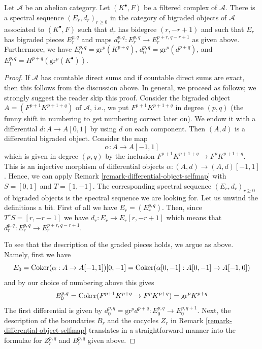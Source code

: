 \begin{lemma}
\label{lemma-spectral-sequence-filtered-complex}
Let $\mathcal{A}$ be an abelian category. Let $(K^\bullet, F)$ be a
filtered complex of $\mathcal{A}$. There is a spectral sequence
$(E_r, d_r)_{r \geq 0}$ in the category of bigraded objects of $\mathcal{A}$
associated to $(K^\bullet, F)$ such that $d_r$ has bidegree $(r, - r + 1)$
and such that $E_r$ has bigraded pieces $E_r^{p, q}$ and maps
$d_r^{p, q} : E_r^{p, q} \to E_r^{p + r, q - r + 1}$ as given above.
Furthermore, we have $E_0^{p, q} = \text{gr}^p(K^{p + q})$,
$d_0^{p, q} = \text{gr}^p(d^{p + q})$,
and $E_1^{p, q} = H^{p + q}(\text{gr}^p(K^\bullet))$.
\end{lemma}

\begin{proof}
If $\mathcal{A}$ has countable direct sums and if countable direct
sums are exact, then this follows from the discussion above.
In general, we proceed as follows; we strongly suggest the reader
skip this proof. Consider the bigraded object $A = (F^{p + 1}K^{p + 1 + q})$
of $\mathcal{A}$, i.e., we put $F^{p + 1}K^{p + 1 + q}$ in degree $(p, q)$
(the funny shift in numbering to get numbering correct later on).
We endow it with a differential $d : A \to A[0, 1]$ by using $d$
on each component. Then $(A, d)$ is a differential bigraded object.
Consider the map
$$
\alpha : A \to A[-1, 1]
$$
which is given in degree $(p, q)$ by the inclusion
$F^{p + 1}K^{p + 1 + q} \to F^pK^{p + 1 + q}$.
This is an injective morphism of differential objects
$\alpha : (A, d) \to (A, d)[-1, 1]$. Hence, we can apply
Remark \ref{remark-differential-object-selfmap}
with $S = [0, 1]$ and $T = [1, -1]$.
The corresponding spectral sequence $(E_r, d_r)_{r \geq 0}$
of bigraded objects is the spectral sequence we are looking
for. Let us unwind the definitions a bit. First of all we have
$E_r = (E_r^{p, q})$. Then, since $T^rS = [r, -r + 1]$
we have $d_r : E_r \to E_r[r, -r + 1]$ which means that
$d_r^{p, q} : E_r^{p, q} \to E_r^{p + r, q - r + 1}$.

\medskip\noindent
To see that the description of the graded pieces holds, we argue
as above. Namely, first we have
$$
E_0 = \mathop{\mathrm{Coker}}(\alpha : A \to A[-1, 1])[0, -1] =
\mathop{\mathrm{Coker}}(\alpha[0, -1] : A[0, -1] \to A[-1, 0])
$$
and by our choice of numbering above this gives
$$
E_0^{p, q} = \mathop{\mathrm{Coker}}(F^{p + 1}K^{p + q} \to F^pK^{p + q}) = \text{gr}^pK^{p + q}
$$
The first differential is given by
$d_0^{p, q} = \text{gr}^pd^{p + q} : E_0^{p, q} \to E_0^{p, q + 1}$.
Next, the description of the boundaries $B_r$ and the cocycles $Z_r$
in Remark \ref{remark-differential-object-selfmap}
translates in a straightforward manner into the formulae
for $Z_r^{p, q}$ and $B_r^{p, q}$ given above.
\end{proof}

